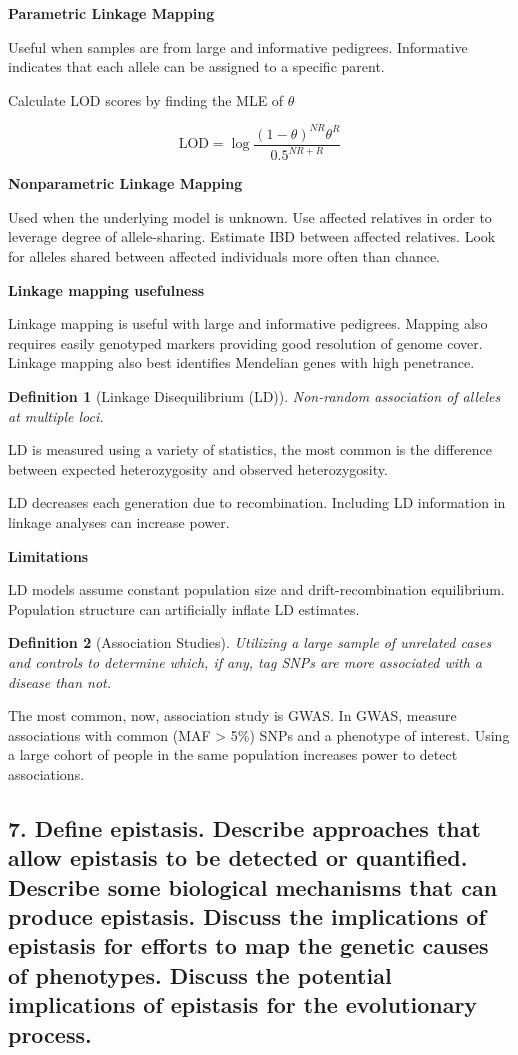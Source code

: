 \documentclass{tufte-handout}
\theoremstyle{noparens}
\newtheorem*{define}{Definition}
\begin{document}
\noindent
\textbf{Parametric Linkage Mapping}

Useful when samples are from large and informative pedigrees. Informative indicates that each allele can be assigned to 	a specific parent.

Calculate LOD scores by finding the MLE of $\theta$

\[ \text{LOD} = \log \frac{(1-\theta)^{NR}\theta^R}{0.5^{NR+R}} \]

\noindent
\textbf{Nonparametric Linkage Mapping}

Used when the underlying model is unknown. Use affected relatives in order to leverage degree of allele-sharing. Estimate IBD between affected relatives. Look for alleles shared between affected individuals more often than chance.

\noindent
\textbf{Linkage mapping usefulness}

Linkage mapping is useful with large and informative pedigrees. Mapping also requires easily genotyped markers providing good resolution of genome cover. Linkage mapping also best identifies Mendelian genes with high penetrance.

\begin{define}[Linkage Disequilibrium (LD)]
Non-random association of alleles at multiple loci.
\end{define}

LD is measured using a variety of statistics, the most common is the difference between expected heterozygosity and observed heterozygosity.

LD decreases each generation due to recombination. Including LD information in linkage analyses can increase power. 

\textbf{Limitations}

LD models assume constant population size and drift-recombination equilibrium. Population structure can artificially inflate LD estimates.

\begin{define}[Association Studies]
Utilizing a large sample of unrelated cases and controls to determine which, if any, tag SNPs are more associated with a disease than not.
\end{define}

The most common, now, association study is GWAS. In GWAS, measure associations with common (MAF > 5\%) SNPs and a phenotype of interest. Using a large cohort of people in the same population increases power to detect associations.

\newpage
\subsection{7. Define epistasis. Describe approaches that allow epistasis to be detected or quantified. Describe some biological mechanisms that can produce epistasis. Discuss the implications of epistasis for efforts to map the genetic causes of phenotypes. Discuss the potential implications of epistasis for the evolutionary process.}
\label{subsec:07}
\end{document}
